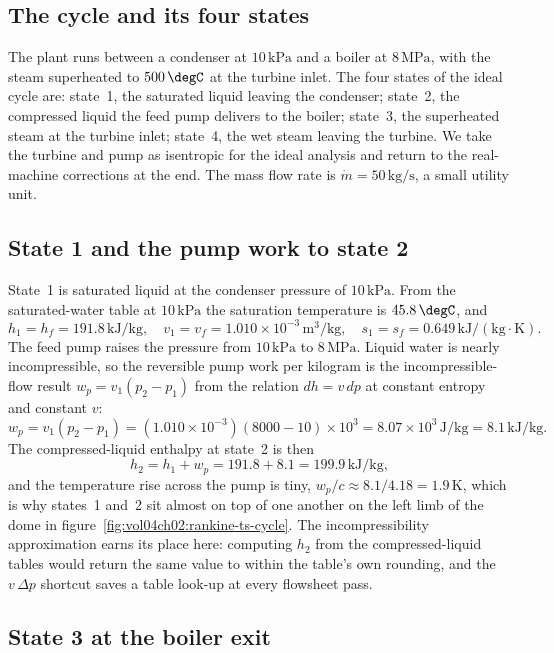 \subsection{The cycle and its four states}

The plant runs between a condenser at $10\,\text{kPa}$ and a boiler at
$8\,\text{MPa}$, with the steam superheated to $500\,\degC$ at the
turbine inlet. The four states of the ideal cycle are: state~1, the
saturated liquid leaving the condenser; state~2, the compressed liquid
the feed pump delivers to the boiler; state~3, the superheated steam at
the turbine inlet; state~4, the wet steam leaving the turbine. We take
the turbine and pump as isentropic for the ideal analysis and return to
the real-machine corrections at the end. The mass flow rate is
$\dot{m} = 50\,\text{kg}/\text{s}$, a small utility unit.

\subsection{State 1 and the pump work to state 2}

State~1 is saturated liquid at the condenser pressure of $10\,\text{kPa}$.
From the saturated-water table at $10\,\text{kPa}$ the saturation
temperature is $45.8\,\degC$, and
\[
h_1 = h_f = 191.8\,\text{kJ}/\text{kg}, \quad
v_1 = v_f = 1.010\times 10^{-3}\,\text{m}^3/\text{kg}, \quad
s_1 = s_f = 0.649\,\text{kJ}/(\text{kg}\cdot\si{\kelvin}).
\]
The feed pump raises the pressure from $10\,\text{kPa}$ to $8\,\text{MPa}$.
Liquid water is nearly incompressible, so the reversible pump work per
kilogram is the incompressible-flow result $w_p = v_1(p_2 - p_1)$ from
the relation $dh = v\,dp$ at constant entropy and constant $v$:
\[
w_p = v_1(p_2 - p_1) = (1.010\times 10^{-3})(8000 - 10)\times 10^3 =
8.07\times 10^3\,\text{J}/\text{kg} = 8.1\,\text{kJ}/\text{kg}.
\]
The compressed-liquid enthalpy at state~2 is then
\[
h_2 = h_1 + w_p = 191.8 + 8.1 = 199.9\,\text{kJ}/\text{kg},
\]
and the temperature rise across the pump is tiny, $w_p/c \approx 8.1/4.18
= 1.9\,\si{\kelvin}$, which is why states~1 and~2 sit almost on top of one
another on the left limb of the dome in
figure~\ref{fig:vol04ch02:rankine-ts-cycle}. The incompressibility
approximation earns its place here: computing $h_2$ from the
compressed-liquid tables would return the same value to within the table's
own rounding, and the $v\,\Delta p$ shortcut saves a table look-up at
every flowsheet pass.

\subsection{State 3 at the boiler exit}

